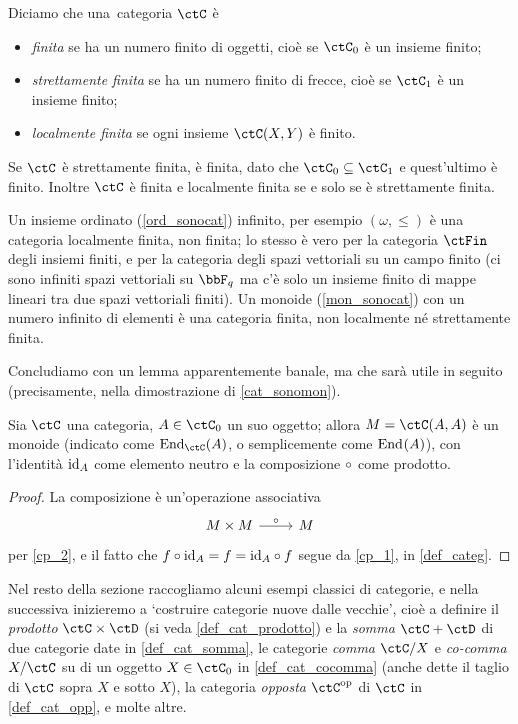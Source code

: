 \begin{definition}\label{cat_finita_locfinita}
	Diciamo che una~categoria \(\ctC\) è
	\begin{itemize}
		\item \emph{finita} se ha un numero finito di oggetti, cioè se \(\ctC_0\) è un insieme finito;
		\item \emph{strettamente finita} se ha un numero finito di frecce, cioè se \(\ctC_1\) è un insieme finito;
		\item \emph{localmente finita} se ogni insieme \(\Hom\ctC(X,Y)\) è finito.
	\end{itemize}
	Se \(\ctC\) è strettamente finita, è finita, dato che \(\ctC_0\subseteq\ctC_1\) e quest'ultimo è finito. Inoltre \(\ctC\) è finita e localmente finita se e solo se è strettamente finita.

	Un insieme ordinato (\ref{ord_sonocat}) infinito, per esempio \((\omega,\le)\) è una categoria localmente finita, non finita; lo stesso è vero per la categoria \(\ctFin\) degli insiemi finiti, e per la categoria degli spazi vettoriali su un campo finito (ci sono infiniti spazi vettoriali su \(\bbF_q\) ma c'è solo un insieme finito di mappe lineari tra due spazi vettoriali finiti). Un monoide (\ref{mon_sonocat}) con un numero infinito di elementi è una categoria finita, non localmente né strettamente finita.
\end{definition}
Concludiamo con un lemma apparentemente banale, ma che sarà utile in seguito (precisamente, nella dimostrazione di \ref{cat_sonomon}).
\begin{lemma}\label{lem_end_monoide}
	Sia \(\ctC\) una categoria, \(A\in\ctC_0\) un suo oggetto; allora \(M=\Hom{\ctC}(A,A)\) è un monoide (indicato come \(\End[\ctC]{A}\), o semplicemente come \(\mathrm{End}_{}(A)\)), con l'identità \(\mathrm{id}_A\) come elemento neutro e la composizione \(\circ\) come prodotto.
\end{lemma}
\begin{proof}
	La composizione è un'operazione associativa
	\[\begin{tikzcd}
			M\times M \ar[r, "\cmp"] & M
		\end{tikzcd}\]
	per \ref{cp_2}, e il fatto che \(f\circ \mathrm{id}_A=f=\mathrm{id}_A\circ f\) segue da \ref{cp_1}, in \ref{def_categ}.
\end{proof}
Nel resto della sezione raccogliamo alcuni esempi classici di categorie, e nella successiva inizieremo a `costruire categorie nuove dalle vecchie', cioè a definire il \emph{prodotto} \(\ctC\times\ctD\) (si veda \ref{def_cat_prodotto}) e la \emph{somma} \(\ctC+\ctD\) di due categorie date in \ref{def_cat_somma}, le categorie \emph{comma} \(\ctC/X\) e \emph{co-comma} \(X/\ctC\) su di un oggetto \(X\in\ctC_0\) in \ref{def_cat_cocomma} (anche dette il taglio di \(\ctC\) sopra \(X\) e sotto \(X\)), la categoria \emph{opposta} \(\ctC^\op\) di \(\ctC\) in \ref{def_cat_opp}, e molte altre.

